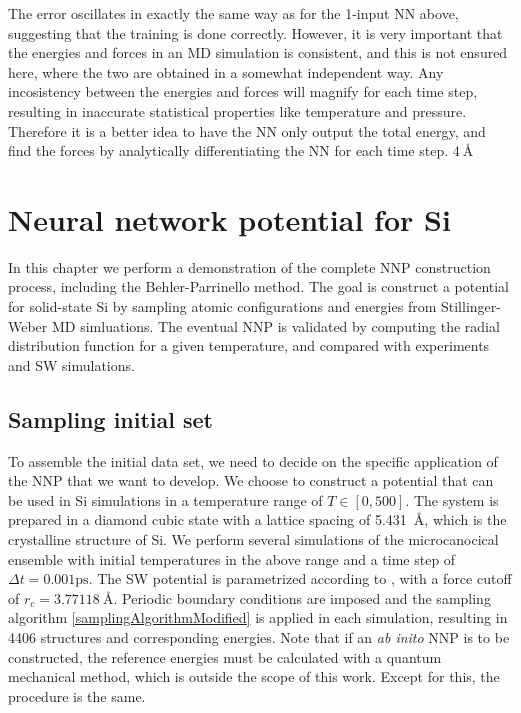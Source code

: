 \documentclass[twoside,english]{uiofysmaster}
\begin{document}
The error oscillates in exactly the same way as for the 1-input NN above, suggesting that the training is done correctly. 
However, it is very important that the energies and forces in an MD simulation is consistent, and this is not 
ensured here, where the two are obtained in a somewhat independent way. Any incosistency between the energies and forces
will magnify for each time step, resulting in inaccurate statistical properties like temperature and pressure. 
Therefore it is a better idea to have the NN only output the total energy, and find the forces by analytically
differentiating the NN for each time step. $\SI{4}{\angstrom}$


\chapter{Neural network potential for Si} \label{sec:SiPotentialResults}
In this chapter we perform a demonstration of the complete NNP construction process, including 
the Behler-Parrinello method. The goal is construct a potential for solid-state Si by sampling atomic configurations 
and energies from Stillinger-Weber MD simluations. 
The eventual NNP is validated by computing the radial distribution function for a given temperature, and compared
with experiments and SW simulations. 

\section{Sampling initial set}
To assemble the initial data set, we need to decide on the specific application of the NNP that we want to develop. 
We choose to construct a potential that can be used in Si simulations in a temperature range of $T \in [0, 500]$. 
The system is prepared in a diamond cubic state with a lattice spacing of \SI{5.431}{\angstrom}, which is 
the crystalline structure of Si. We perform several simulations of the microcanocical ensemble with initial temperatures
in the above range and a time step of $\Delta t = 0.001 \mathrm{ps}$.
The SW potential is parametrized according to \cite{Stillinger85}, with a force cutoff 
of $r_c = \SI{3.77118}{\angstrom}$. 
Periodic boundary conditions are imposed and the sampling algorithm 
\eqref{samplingAlgorithmModified} is applied in each simulation, resulting in 4406 structures and corresponding energies.
Note that if an \textit{ab inito} NNP is to be constructed, the reference energies must be calculated with a
quantum mechanical method, which is outside the scope of this work. Except for this, the procedure is the same. 
\end{document}

